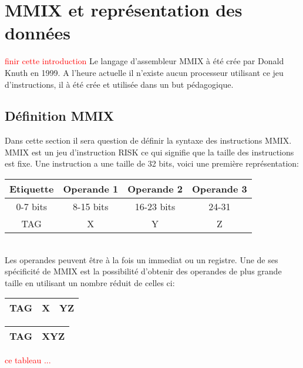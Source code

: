 \documentclass {article}
\theoremstyle{definition}
\theoremstyle{remark}
\newcommand{\todo}[1]{\textcolor{red}{#1}}
\begin{document}
\section{MMIX et représentation des données}
\label{partieMMIX}

\todo{finir cette introduction}
Le langage d'assembleur MMIX à été crée par Donald Knuth en 1999.
A l'heure actuelle il n'existe aucun processeur utilisant ce jeu d'instructions, il
à été crée et utilisée dans un but pédagogique.



\subsection{Définition MMIX}

Dans cette section il sera question de définir la syntaxe des instructions MMIX.
MMIX est un jeu d'instruction RISK ce qui signifie que la taille des instructions
est fixe. Une instruction a une taille de 32 bits, voici une première représentation:

\begin{tabular}{|c|c|c|c|}
  \hline
  Etiquette & Operande 1 & Operande 2 & Operande 3\\
  \hline
  0-7 bits & 8-15 bits & 16-23 bits & 24-31  \\
  \hline
  TAG & X & Y & Z \\
  \hline
\end{tabular}
\\
Les operandes peuvent être à la fois un immediat ou un registre.
Une de ses spécificité de MMIX est la possibilité d'obtenir des operandes
de plus grande taille en utilisant un nombre réduit de celles ci:\\

\begin{tabular}{|c|c|c|}
  \hline 
  TAG & X & YZ \\
  \hline
\end{tabular}
\begin{tabular}{|c|c|}
  \hline 
  TAG & XYZ \\
  \hline
\end{tabular}

\todo{ce tableau ...}
\end{document}
